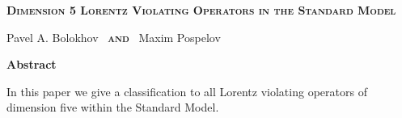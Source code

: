 \documentclass[12pt]{revtex4}
\begin{document}
\begin{titlepage}
\renewcommand{\thefootnote}{\fnsymbol{footnote}}

\vspace*{3.0cm}
\begin{center}
{\Large
  \textbf{
  \textsc{Dimension 5 Lorentz Violating Operators in the Standard Model}
         }
      }

\vspace*{1.0cm}
  {\large {}\selectfont Pavel A. Bolokhov~ 
	{\normalsize\bf \textsc{and}} ~Maxim Pospelov}

\vspace*{1.5cm}
{\large\bf Abstract}
\end{center}

In this paper we give a classification to all Lorentz violating 
operators of dimension five within the Standard Model.


\end{titlepage}

\newpage

\tableofcontents

\newpage
\end{document}
